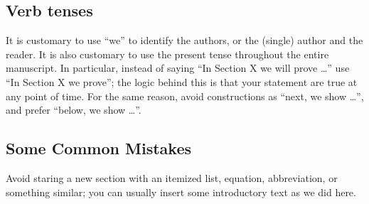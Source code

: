 \documentclass[letterpaper, 10 pt, conference]{ieeeconf}
\begin{document}
\subsection{Verb tenses}
It is customary to use ``we'' to identify the authors, or the (single) author and the reader. It is also customary to use the present tense throughout the entire manuscript. In particular, instead of saying ``In Section X we will prove \ldots'' use ``In Section X we prove''; the logic behind this is that your statement are true at any point of time. For the same reason, avoid constructions as ``next, we show \ldots'', and prefer ``below, we show \ldots''.

\subsection{Some Common Mistakes}\label{sec:mistakes}
Avoid staring a new section with an itemized list, equation, abbreviation, or something similar; you can usually insert some introductory text as we did here.
\end{document}
